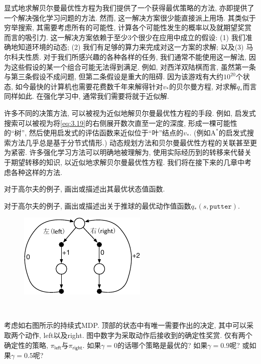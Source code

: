 显式地求解贝尔曼最优性方程为我们提供了一个获得最优策略的方法, 亦即提供了一个解决强化学习问题的方法. 然而, 这一解决方案很少能直接派上用场. 其类似于穷举搜索, 其需要考虑所有的可能性, 计算各个可能性发生的概率以及就期望奖赏而言的吸引力. 这一解决方案依赖于至少3个很少在应用中成立的假设: (1) 我们准确地知道环境的动态; (2) 我们有足够的算力来完成对这一方案的求解; 以及(3) 马尔科夫性质. 对于我们所感兴趣的各种各样的任务, 我们通常不能使用这一解法, 因为这些假设的某一个组合可能无法得到满足. 例如, 对西洋双陆棋而言, 虽然第一条与第三条假设不成问题, 但第二条假设是重大的阻碍. 因为该游戏有大约$10^{20}$个状态, 如今最快的计算机也需要花费数千年来解得针对$v_*$的贝尔曼方程, 对求解$q_*$而言同样如此. 在强化学习中, 通常我们需要将就于近似解. 

许多不同的决策方法, 可以被视为近似地解贝尔曼最优性方程的手段. 例如, 启发式搜索可以被视为将\eqref{eq:3.19}的右侧展开数次直至一定的深度, 形成一棵可能性的``树'', 然后使用启发式的评估函数来近似位于``叶''结点的$v_*$. (例如$\mathrm{A}^*$的启发式搜索方法几乎总是基于分节式情形.) 动态规划方法和贝尔曼最优性方程的关联甚至更为紧密. 许多强化学习方法可以明确地被理解为, 使用实际经历到的转移来代替关于期望转移的知识, 以近似地求解贝尔曼最优性方程. 我们将在接下来的几章中考虑各种这样的方法.

\begin{exer}
对于高尔夫的例子, 画出或描述出其最优状态值函数.
\end{exer}

\begin{exer}
对于高尔夫的例子, 画出或描述出关于推球的最优动作值函数$q_*(s, \mathtt{putter})$.
\end{exer}

\vspace{-2em}
\begin{figure}
\centering
\includegraphics[width=.3\textwidth]{c3/img/exercise3-22.pdf}
\end{figure}
\mbox{}~
\begin{exer}
考虑如右图所示的持续式MDP. 顶部的状态中有唯一需要作出的决定, 其中可以采取两个动作, \textsf{left}以及\textsf{right}. 图中数字为采取动作后接收到的确定性奖赏. 仅有两个确定性的策略, $\pi_{\mathsf{left}}$与$\pi_{\mathsf{right}}$. 如果$\gamma = 0$的话哪个策略是最优的? 如果$\gamma = 0.9$呢? 或如果$\gamma = 0.5$呢?
\end{exer}

